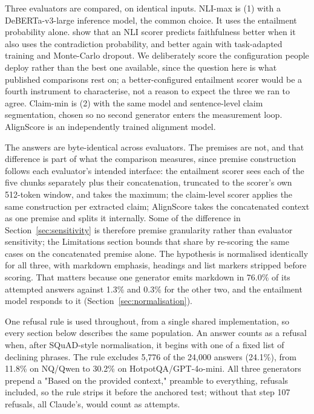 \documentclass[11pt]{article}
\begin{document}
Three evaluators are compared, on identical inputs. NLI-max is (1) with a DeBERTa-v3-large \citep{he-etal-2023} inference model, the common choice. It uses the entailment probability alone. \citet{steen-etal-2023} show that an NLI scorer predicts faithfulness better when it also uses the contradiction probability, and better again with task-adapted training and Monte-Carlo dropout. We deliberately score the configuration people deploy rather than the best one available, since the question here is what published comparisons rest on; a better-configured entailment scorer would be a fourth instrument to characterise, not a reason to expect the three we ran to agree. Claim-min is (2) with the same model and sentence-level claim segmentation, chosen so no second generator enters the measurement loop. AlignScore \citep{zha-etal-2023} is an independently trained alignment model.

The answers are byte-identical across evaluators. The premises are not, and that difference is part of what the comparison measures, since premise construction follows each evaluator's intended interface: the entailment scorer sees each of the five chunks separately plus their concatenation, truncated to the scorer's own 512-token window, and takes the maximum; the claim-level scorer applies the same construction per extracted claim; AlignScore takes the concatenated context as one premise and splits it internally. Some of the difference in Section~\ref{sec:sensitivity} is therefore premise granularity rather than evaluator sensitivity; the Limitations section bounds that share by re-scoring the same cases on the concatenated premise alone. The hypothesis is normalised identically for all three, with markdown emphasis, headings and list markers stripped before scoring. That matters because one generator emits markdown in 76.0\% of its attempted answers against 1.3\% and 0.3\% for the other two, and the entailment model responds to it (Section~\ref{sec:normalisation}).

One refusal rule is used throughout, from a single shared implementation, so every section below describes the same population. An answer counts as a refusal when, after SQuAD-style normalisation, it begins with one of a fixed list of declining phrases. The rule excludes 5,776 of the 24,000 answers (24.1\%), from 11.8\% on NQ/Qwen to 30.2\% on HotpotQA/GPT-4o-mini. All three generators prepend a "Based on the provided context," preamble to everything, refusals included, so the rule strips it before the anchored test; without that step 107 refusals, all Claude's, would count as attempts.
\end{document}
